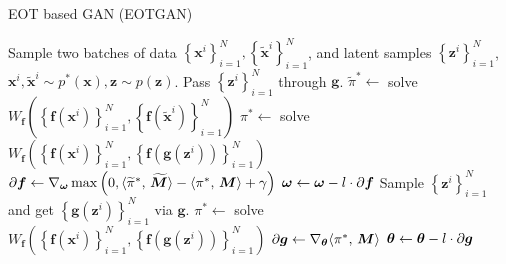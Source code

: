 \begin{algorithm}[!t]
  \caption{EOT based GAN (EOTGAN)}\label{algo-eWGAN}
  \begin{algorithmic}[1]
    \STATE Sample two batches of data $ \left\{ \bm{x}^{i}
    \right\}_{i=1}^{N}, \left\{ \tilde{\bm{x}}^{i} \right\}_{i=1}^{N}  $,
    and latent samples $\left\{ \bm{z}^{i} \right\}_{i=1}^{N} $,
    $\bm{x}^{i},\tilde{\bm{x}}^{i} \sim p^{\ast}(\bm{x}), \bm{z}\sim p(\bm{z})$.
    \STATE Pass
    $\left\{ \bm{z}^{i} \right\}_{i=1}^{N}$ through $\bm{g}$.
    \STATE $\widetilde{\pi}^{\ast} \gets$ solve $ W_{\bm{f}}\left( \left\{ \bm{f}(\bm{x}^{i})
      \right\}_{i=1}^{N} , \left\{ \bm{f}(\tilde{\bm{x}}^{i})
      \right\}_{i=1}^{N}\right)$
    \STATE ${\pi}^{\ast} \gets$ solve $W_{\bm{f}}\left( \left\{ \bm{f}(\bm{x}^{i})
      \right\}_{i=1}^{N}, \left\{ \bm{f}(\bm{g}(\bm{z}^i))
      \right\}_{i=1}^{N} \right)$
    \STATE $\partial{\bm{f}} \gets \nabla_{\bm{\omega}} \max\left(0,  \langle \widetilde{\pi}^{\ast},\,\widetilde{\bm{M}}\rangle-\langle {\pi^{\ast}},\,\bm{M}\rangle+ \gamma\right)$
    \STATE $\bm{\omega} \gets \bm{\omega} - l \cdot \partial{\bm{f}}$
    \STATE Sample $\left\{ \bm{z}^{i} \right\}_{i=1}^{N}$
    and get $ \left\{ \bm{g}(\bm{z}^i)\right\}_{i=1}^{N}$ via $\bm{g}$.
    \STATE $\pi^{\ast} \gets$ solve $W_{\bm{f}}\left( \left\{ \bm{f}(\bm{x}^{i})
      \right\}_{i=1}^{N}, \left\{ \bm{f}(\bm{g}(\bm{z}^{i}))
      \right\}_{i=1}^{N} \right)$
    \STATE $\partial{\bm{g}} \gets \nabla_{\bm{\theta}} \langle \pi^{\ast},\,\bm{M}\rangle$
    \STATE $\bm{\theta} \gets \bm{\theta} -l \cdot \partial{\bm{g}}$
    \ENDWHILE
  \end{algorithmic}

\end{algorithm}


